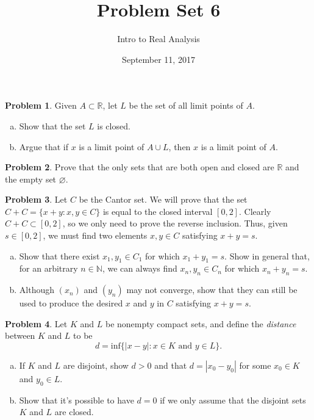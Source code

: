 \documentclass{amsart}
\newcommand{\+}[1]{\ensuremath{\mathbf{#1}}}
\newcommand{\R}{{\mathbb R}}
\renewcommand{\emptyset}{\varnothing}
\theoremstyle{definition}
\newtheorem{prob}{Problem}
\begin{document}
\title{Problem Set 6}
\date{September 11, 2017}
\author{Intro to Real Analysis}

\maketitle


\begin{prob}
 Given $A \subset \R$, let $L$ be the set
 of all limit points of $A$.
 \begin{enumerate}[(a)]
  \item Show that the set $L$ is closed.
  \item Argue that if $x$ is a limit point
  of $A \cup L$, then $x$ is a limit point of $A$.
 \end{enumerate}
\end{prob}

\begin{prob}
 Prove that the only sets that are both open and closed
 are $\R$ and the empty set $\emptyset$.
\end{prob}

\begin{prob}
 Let $C$ be the Cantor set.  We will prove that the set 
 $C+C = \{x+y: x,y \in C\}$
 is equal to the closed interval $[0,2]$.
 Clearly $C+C \subset [0,2]$, so we
 only need to prove the reverse inclusion.
 Thus, given $s \in [0,2]$, we must find two
 elements $x,y \in C$ satisfying $x+y = s$.
 \begin{enumerate}[(a)]
  \item Show that there exist $x_1,y_1 \in C_1$
  for which $x_1 + y_1 = s$.
  Show in general that, for an arbitrary $n \in \mathbb{N}$,
  we can always find $x_n,y_n \in C_n$
  for which $x_n+y_n=s$.
  \item Although $(x_n)$ and $(y_n)$ may not
  converge, show that they can still be used to
  produce the desired $x$ and $y$ in $C$
  satisfying $x+y = s$.
 \end{enumerate}
\end{prob}

\begin{prob}
 Let $K$ and $L$ be nonempty compact sets, and define
 the \emph{distance} between $K$ and $L$ to be
 \[
 d = \text{inf}\{|x-y|:x \in K \text{ and } y \in L\}.
 \]
 \begin{enumerate}[(a)]
  \item If $K$ and $L$ are disjoint, show $d>0$
  and that $d = |x_0-y_0|$ for some $x_0 \in K$
  and $y_0 \in L$.
  \item Show that it's possible to have $d=0$
  if we only assume that the disjoint sets
  $K$ and $L$ are closed.
 \end{enumerate}
\end{prob}
\end{document}
